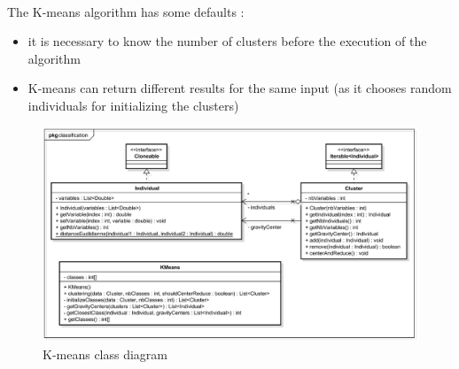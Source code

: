 ~~

The K-means \gls{algorithm} has some defaults : 
\begin{itemize}
	\item it is necessary to know the number of clusters before the execution of the \gls{algorithm}
	\item K-means can return different results for the same input (as it chooses random \glspl{individual} for initializing the \glspl{cluster})
\end{itemize}


\begin{figure}[h]
	\centering 
	\includegraphics[width=1\textwidth]{images/diagrams/class_diagram_kmeans}
	\caption{K-means class diagram}
	\label{fig:diagram:class:kmeans}
\end{figure}



